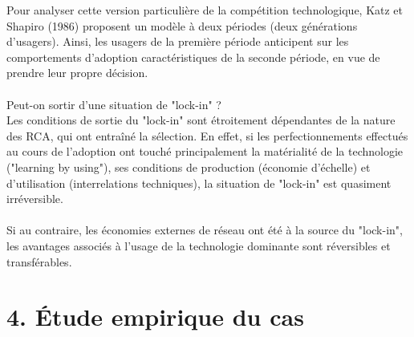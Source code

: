 \documentclass[a4paper, 10pt]{article}
\begin{document}
Pour analyser cette version particulière de la compétition technologique,
Katz et Shapiro (1986) proposent un modèle à deux périodes (deux générations d'usagers).
Ainsi, les usagers de la première période anticipent sur les comportements d'adoption caractéristiques de la seconde période,
en vue de prendre leur propre décision.\\ \\
Peut-on sortir d'une situation de "lock-in" ?\\
Les conditions de sortie du "lock-in" sont étroitement dépendantes de la nature des RCA, qui ont entraîné la sélection.
En effet, si les perfectionnements effectués au cours de l'adoption ont touché principalement la matérialité de la technologie
("learning by using"), ses conditions de production (économie d'échelle) et d'utilisation (interrelations techniques),
la situation de "lock-in" est quasiment irréversible.\\ \\
Si au contraire, les économies externes de réseau ont été à la source du "lock-in",
les avantages associés à l'usage de la technologie dominante sont réversibles et transférables.
\newpage

\section*{4. Étude empirique du cas}
\indent
\end{document}
